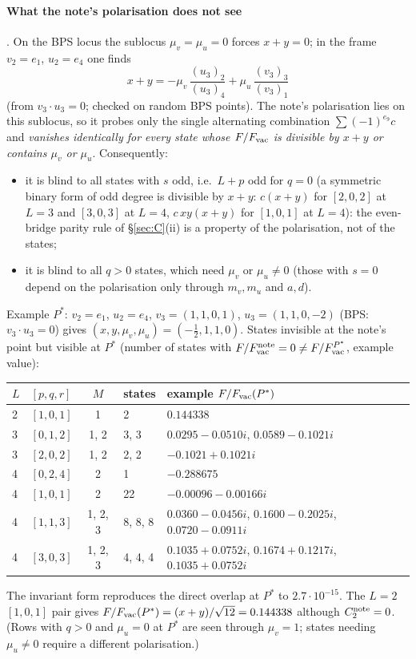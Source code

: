 \paragraph{What the note's polarisation does not see} \npy. On the BPS locus the sublocus $\mu_v=\mu_u=0$ forces $x+y=0$; in the frame $v_2=e_1$, $u_2=e_4$ one finds
\begin{equation}
 x+y=-\mu_v\,\frac{(u_3)_2}{(u_3)_4}+\mu_u\,\frac{(v_3)_3}{(v_3)_1}
\end{equation}
(from $v_3\cdot u_3=0$; checked on random BPS points). The note's polarisation lies on this sublocus, so it probes only the single alternating combination $\sum(-1)^{e_9}c$ and \emph{vanishes identically for every state whose $F/F_{\rm vac}$ is divisible by $x+y$ or
contains $\mu_v$ or $\mu_u$}. Consequently:
\begin{itemize}
\item it is blind to all states with $s$ odd, i.e.\ $L+p$ odd for $q=0$ (a symmetric binary form of odd degree is divisible by $x+y$: $c(x+y)$ for $[2,0,2]$ at $L=3$ and $[3,0,3]$ at $L=4$, $c\,xy(x+y)$ for $[1,0,1]$ at $L=4$): the even-bridge parity rule of \S\ref{sec:C}(ii) is a property of the
polarisation, not of the states;
\item it is blind to all $q>0$ states, which need $\mu_v$ or $\mu_u\ne0$ (those with $s=0$ depend on the polarisation only through $m_v,m_u$ and $a,d$).
\end{itemize}
Example $P^*$: $v_2=e_1$, $u_2=e_4$, $v_3=(1,1,0,1)$, $u_3=(1,1,0,-2)$ (BPS: $v_3\cdot u_3=0$) gives $(x,y,\mu_v,\mu_u)=(-\tfrac12,1,1,0)$. States invisible at the note's point but visible at $P^*$ (number of states with $F/F_{\rm vac}^{\rm note}=0\neq F/F_{\rm vac}^{P^*}$, example value):
\begin{center}
\begin{tabular}{llcll}
\toprule
$L$ & $[p,q,r]$ & $M$ & states & example $F/F_{\rm vac}(P^*)$\\
\midrule
2 & $[1,0,1]$ & 1 & 2 & $0.144338$\\
3 & $[0,1,2]$ & 1, 2 & 3, 3 & $0.0295-0.0510i$, $0.0589-0.1021i$\\
3 & $[2,0,2]$ & 1, 2 & 2, 2 & $-0.1021+0.1021i$\\
4 & $[0,2,4]$ & 2 & 1 & $-0.288675$\\
4 & $[1,0,1]$ & 2 & 22 & $-0.00096-0.00166i$\\
4 & $[1,1,3]$ & 1, 2, 3 & 8, 8, 8 & $0.0360-0.0456i$, $0.1600-0.2025i$, $0.0720-0.0911i$\\
4 & $[3,0,3]$ & 1, 2, 3 & 4, 4, 4 & $0.1035+0.0752i$, $0.1674+0.1217i$, $0.1035+0.0752i$\\
\bottomrule
\end{tabular}
\end{center}
The invariant form reproduces the direct overlap at $P^*$ to $2.7\cdot10^{-15}$. The $L=2$ $[1,0,1]$ pair gives $F/F_{\rm vac}(P^*)=(x+y)/\sqrt{12}=0.144338$ although $C_2^{\rm note}=0$. (Rows with $q>0$ and $\mu_u=0$ at $P^*$ are
seen through $\mu_v=1$; states needing $\mu_u\ne0$ require a different polarisation.)
